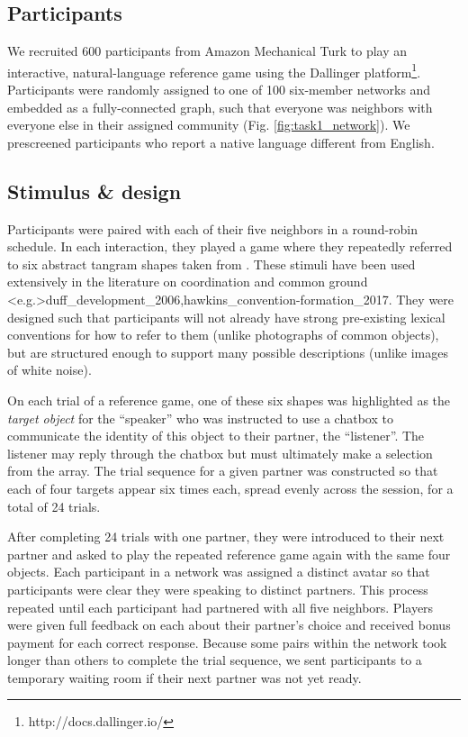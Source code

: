 \documentclass[11pt, floatsintext]{apa6}
\begin{document}
\subsection{Participants}

We recruited 600 participants from Amazon Mechanical Turk to play an interactive, natural-language reference game using the Dallinger platform\footnote{http://docs.dallinger.io/}.
Participants were randomly assigned to one of 100 six-member networks and embedded as a fully-connected graph, such that everyone was neighbors with everyone else in their assigned community (Fig. \ref{fig:task1_network}). 
We prescreened participants who report a native language different from English. 

\subsection{Stimulus \& design}

Participants were paired with each of their five neighbors in a round-robin schedule.
In each interaction, they played a game where they repeatedly referred to six abstract tangram shapes taken from .
These stimuli have been used extensively in the literature on coordination and common ground \shortcite<e.g.>{duff_development_2006,hawkins_convention-formation_2017}.
They were designed such that participants will not already have strong pre-existing lexical conventions for how to refer to them (unlike photographs of common objects), but are structured enough to support many possible descriptions (unlike images of white noise).

On each trial of a reference game, one of these six shapes was highlighted as the \emph{target object} for the ``speaker'' who was instructed to use a chatbox to communicate the identity of this object to their partner, the ``listener''.
The listener may reply through the chatbox but must ultimately make a selection from the array. 
The trial sequence for a given partner was constructed so that each of four targets appear six times each, spread evenly across the session, for a total of 24 trials.

After completing 24 trials with one partner, they were introduced to their next partner and asked to play the repeated reference game again with the same four objects.
Each participant in a network was assigned a distinct avatar so that participants were clear they were speaking to distinct partners.
This process repeated until each participant had partnered with all five neighbors.
Players were given full feedback on each about their partner's choice and received bonus payment for each correct response. 
Because some pairs within the network took longer than others to complete the trial sequence, we sent participants to a temporary waiting room if their next partner was not yet ready. 
\end{document}
